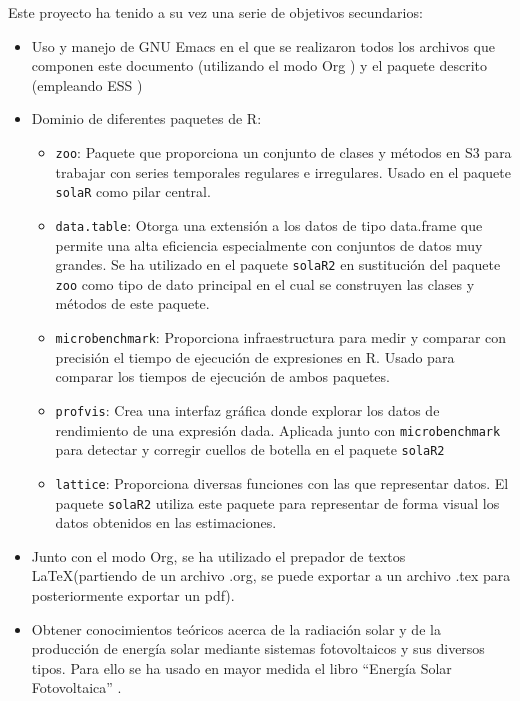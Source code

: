 Este proyecto ha tenido a su vez una serie de objetivos secundarios:
\begin{itemize}
\item Uso y manejo de GNU Emacs \cite{emacs85} en el que se realizaron todos los archivos que componen este documento (utilizando el modo Org \cite{dominik03}) y el paquete descrito (empleando ESS \cite{ess24})
\item Dominio de diferentes paquetes de R:
\begin{itemize}
\item \texttt{zoo}\cite{zeileis05}: Paquete que proporciona un conjunto de clases y métodos en S3 para trabajar con series temporales regulares e irregulares.
Usado en el paquete \texttt{solaR} como pilar central.
\item \texttt{data.table}\cite{barrett24}: Otorga una extensión a los datos de tipo data.frame que permite una alta eficiencia especialmente con conjuntos de datos muy grandes.
Se ha utilizado en el paquete \texttt{solaR2} en sustitución del paquete \texttt{zoo} como tipo de dato principal en el cual se construyen las clases y métodos de este paquete.
\item \texttt{microbenchmark}\cite{mersmann23}: Proporciona infraestructura para medir y comparar con precisión el tiempo de ejecución de expresiones en R.
Usado para comparar los tiempos de ejecución de ambos paquetes.
\item \texttt{profvis}\cite{wickham24}: Crea una interfaz gráfica donde explorar los datos de rendimiento de una expresión dada.
Aplicada junto con \texttt{microbenchmark} para detectar y corregir cuellos de botella en el paquete \texttt{solaR2}
\item \texttt{lattice}\cite{sarkar08}: Proporciona diversas funciones con las que representar datos.
El paquete \texttt{solaR2} utiliza este paquete para representar de forma visual los datos obtenidos en las estimaciones.
\end{itemize}
\item Junto con el modo Org, se ha utilizado el prepador de textos \LaTeX (partiendo de un archivo .org, se puede exportar a un archivo .tex para posteriormente exportar un pdf).
\item Obtener conocimientos teóricos acerca de la radiación solar y de la producción de energía solar mediante sistemas fotovoltaicos y sus diversos tipos.
Para ello se ha usado en mayor medida el libro ``Energía Solar Fotovoltaica'' \cite{Perpinan2023}.
\end{itemize}
